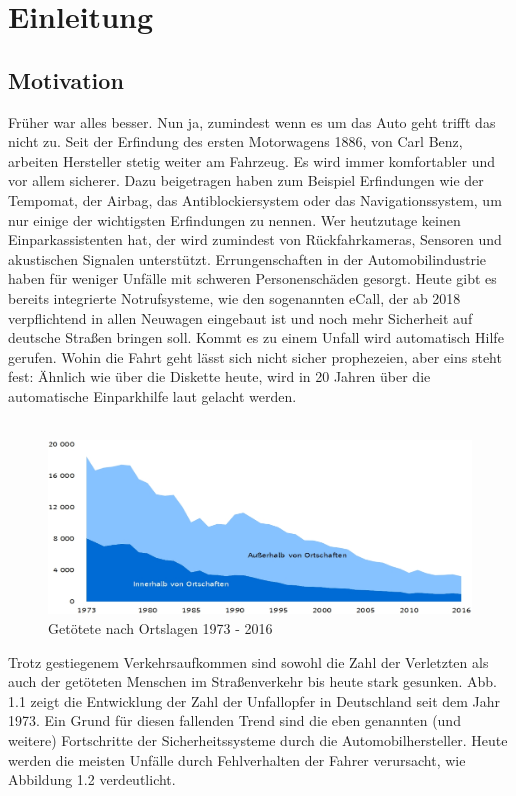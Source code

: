 \chapter{Einleitung}

\section{Motivation}
\label{subsec:motivation}
Früher war alles besser. Nun ja, zumindest wenn es um das Auto geht trifft das nicht zu. Seit der Erfindung des ersten Motorwagens 1886, von Carl Benz, arbeiten Hersteller stetig weiter am Fahrzeug. Es wird immer komfortabler und vor allem sicherer. Dazu beigetragen haben zum Beispiel Erfindungen wie der Tempomat, der Airbag, das Antiblockiersystem oder das Navigationssystem, um nur einige der wichtigsten Erfindungen zu nennen.
Wer heutzutage keinen Einparkassistenten hat, der wird zumindest von Rückfahrkameras, Sensoren und akustischen Signalen unterstützt. 
Errungenschaften in der Automobilindustrie haben für weniger Unfälle mit schweren Personenschäden gesorgt. Heute gibt es bereits integrierte Notrufsysteme, wie den sogenannten eCall, der ab 2018 verpflichtend in allen Neuwagen eingebaut ist und noch mehr Sicherheit auf deutsche Straßen bringen soll. Kommt es zu einem Unfall wird automatisch Hilfe gerufen.
Wohin die Fahrt geht lässt sich nicht sicher prophezeien, aber eins steht fest: Ähnlich wie über die Diskette heute, wird in 20 Jahren über die automatische Einparkhilfe laut gelacht werden.\\  \\
\label{sec:einleitung}
\begin{figure}[htb]
  \centering  
  \includegraphics[scale=1.5]{img/Unfalle.jpg}
  \caption{Getötete nach Ortslagen 1973 - 2016\cite{bild1}}
  \label{fig:toteSeit1973}
\end{figure}
Trotz gestiegenem Verkehrsaufkommen sind sowohl die Zahl der Verletzten als auch der getöteten Menschen im Straßenverkehr bis heute stark gesunken. Abb. 1.1 zeigt die Entwicklung der Zahl der Unfallopfer in Deutschland seit dem Jahr 1973. Ein Grund für diesen fallenden Trend sind die eben genannten (und weitere) Fortschritte der Sicherheitssysteme durch die Automobilhersteller. Heute werden die meisten Unfälle durch Fehlverhalten der Fahrer verursacht, wie Abbildung 1.2 verdeutlicht. \\
